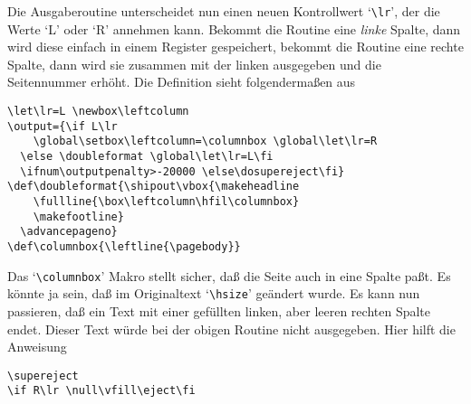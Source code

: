Die Ausgaberoutine unterscheidet nun einen neuen Kontrollwert
`\verb|\lr|', der die Werte `L' oder `R' annehmen kann. Bekommt die
Routine eine {\em linke} Spalte, dann wird diese einfach in einem
Register gespeichert, bekommt die Routine eine rechte Spalte, dann
wird sie zusammen mit der linken ausgegeben und die
Seitennummer
erh\"oht. Die Definition sieht folgenderma\ss{}en aus
\begin{verbatim}
\let\lr=L \newbox\leftcolumn
\output={\if L\lr
    \global\setbox\leftcolumn=\columnbox \global\let\lr=R
  \else \doubleformat \global\let\lr=L\fi
  \ifnum\outputpenalty>-20000 \else\dosupereject\fi}
\def\doubleformat{\shipout\vbox{\makeheadline
    \fullline{\box\leftcolumn\hfil\columnbox}
    \makefootline}
  \advancepageno}
\def\columnbox{\leftline{\pagebody}}
\end{verbatim}
Das `\verb|\columnbox|' Makro stellt sicher, da\ss{} die Seite auch in
eine Spalte pa\ss{}t. Es k\"onnte ja sein, da\ss{} im Originaltext
`\verb|\hsize|'
ge\"andert wurde. Es kann nun passieren, da\ss{} ein Text mit einer
gef\"ullten linken, aber leeren rechten Spalte endet. Dieser Text w\"urde
bei der obigen Routine nicht ausgegeben. Hier hilft die Anweisung
\begin{verbatim}
\supereject
\if R\lr \null\vfill\eject\fi
\end{verbatim}
